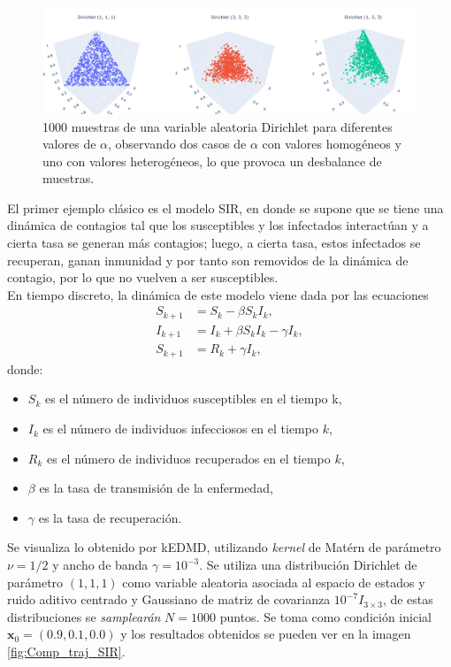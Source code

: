 \begin{figure}[htbp]
    \centering
    \includegraphics[width=0.95\linewidth]{img/content/chapter3/Dirichlet.pdf}
    \caption{1000 muestras de una variable aleatoria Dirichlet para diferentes valores de $\alpha$, observando dos casos de $\alpha$ con valores homogéneos y uno con valores heterogéneos, lo que provoca un desbalance de muestras.}
    \label{fig:Dirichlet_samples}
\end{figure}
El primer ejemplo clásico es el modelo SIR, en donde se supone que se tiene una dinámica de contagios tal que los susceptibles y los infectados interactúan y a cierta tasa se generan más contagios; luego, a cierta tasa, estos infectados se recuperan, ganan inmunidad y por tanto son removidos de la dinámica de contagio, por lo que no vuelven a ser susceptibles.\\
En tiempo discreto, la dinámica de este modelo viene dada por las ecuaciones
\begin{equation}
    \begin{aligned}
    S_{k+1} &= S_k -\beta S_k I_k, \\
    I_{k+1} &= I_k + \beta S_k I_k - \gamma I_k, \\
    S_{k+1} &= R_k + \gamma I_k,
    \end{aligned}
    \label{eq:SIR}
\end{equation}
donde:
\begin{itemize}
    \item \(S_k\) es el número de individuos susceptibles en el tiempo k,
    \item \(I_k\) es el número de individuos infecciosos en el tiempo \(k\),
    \item \(R_k\) es el número de individuos recuperados en el tiempo \(k\),
    \item \(\beta\) es la tasa de transmisión de la enfermedad,
    \item \(\gamma\) es la tasa de recuperación.
\end{itemize}
Se visualiza lo obtenido por kEDMD, utilizando \textit{kernel} de Matérn de parámetro $\nu=1/2$ y ancho de banda $\gamma=10^{-3}$. Se utiliza una distribución Dirichlet de parámetro $(1,1,1)$ como variable aleatoria asociada al espacio de estados y ruido aditivo centrado y Gaussiano de matriz de covarianza $10^{-7} I_{3 \times 3}$, de estas distribuciones se \textit{samplearán} $N=1000$ puntos. Se toma como condición inicial $\mathbf{x}_0 = (0.9, 0.1, 0.0)$ y los resultados obtenidos se pueden ver en la imagen \ref{fig:Comp_traj_SIR}. \\
